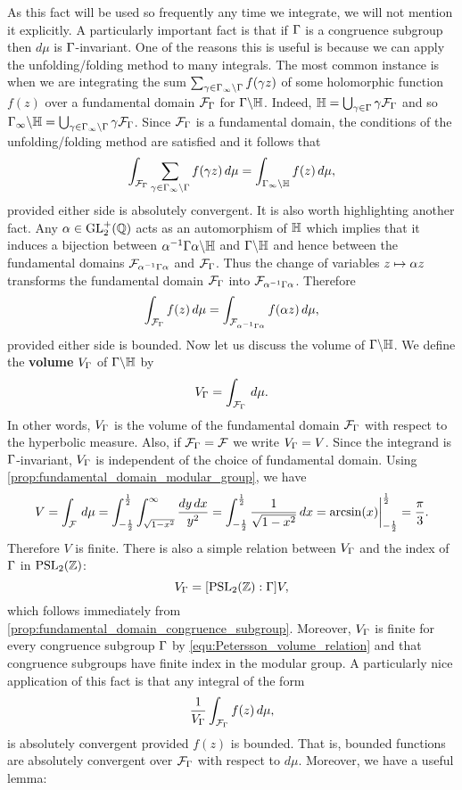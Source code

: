     As this fact will be used so frequently any time we integrate, we will not mention it explicitly. A particularly important fact is that if $\Gamma$ is a congruence subgroup then $d\mu$ is $\Gamma$-invariant. One of the reasons this is useful is because we can apply the unfolding/folding method to many integrals. The most common instance is when we are integrating the sum $\sum_{\gamma \in \Gamma_{\infty}\backslash\Gamma}f(\gamma z)$ of some holomorphic function $f(z)$ over a fundamental domain $\mathcal{F}_{\Gamma}$ for $\Gamma\backslash\mathbb{H}$. Indeed, $\mathbb{H} = \bigcup_{\gamma \in \Gamma}\gamma\mathcal{F}_{\Gamma}$ and so $\Gamma_{\infty}\backslash\mathbb{H} = \bigcup_{\gamma \in \Gamma_{\infty}\backslash\Gamma}\gamma\mathcal{F}_{\Gamma}$. Since $\mathcal{F}_{\Gamma}$ is a fundamental domain, the conditions of the unfolding/folding method are satisfied and it follows that
    \[
      \int_{\mathcal{F}_{\Gamma}}\sum_{\gamma \in \Gamma_{\infty}\backslash\Gamma}f(\gamma z)\,d\mu = \int_{\Gamma_{\infty}\backslash\mathbb{H}}f(z)\,d\mu,
    \]
    provided either side is absolutely convergent. It is also worth highlighting another fact. Any $\alpha \in \mathrm{GL}_{2}^{+}(\mathbb{Q})$ acts as an automorphism of $\mathbb{H}$ which implies that it induces a bijection between $\alpha^{-1}\Gamma\alpha\backslash\mathbb{H}$ and $\Gamma\backslash\mathbb{H}$ and hence between the fundamental domains $\mathcal{F}_{\alpha^{-1}\Gamma\alpha}$ and $\mathcal{F}_{\Gamma}$. Thus the change of variables $z \mapsto \alpha z$ transforms the fundamental domain $\mathcal{F}_{\Gamma}$ into $\mathcal{F}_{\alpha^{-1}\Gamma\alpha}$. Therefore
    \[
      \int_{\mathcal{F}_{\Gamma}}f(z)\,d\mu = \int_{\mathcal{F}_{\alpha^{-1}\Gamma\alpha}}f(\alpha z)\,d\mu,
    \]
    provided either side is bounded. Now let us discuss the volume of $\Gamma\backslash\mathbb{H}$. We define the \textbf{volume} $V_{\Gamma}$ of $\Gamma\backslash\mathbb{H}$ by
    \[
      V_{\Gamma} = \int_{\mathcal{F}_{\Gamma}}\,d\mu.
    \]
    In other words, $V_{\Gamma}$ is the volume of the fundamental domain $\mathcal{F}_{\Gamma}$ with respect to the hyperbolic measure. Also, if $\mathcal{F}_{\Gamma} = \mathcal{F}$ we write $V_{\Gamma} = V$. Since the integrand is $\Gamma$-invariant, $V_{\Gamma}$ is independent of the choice of fundamental domain. Using \cref{prop:fundamental_domain_modular_group}, we have
    \[
      V = \int_{\mathcal{F}}\,d\mu = \int_{-\frac{1}{2}}^{\frac{1}{2}}\int_{\sqrt{1-x^{2}}}^{\infty}\frac{dy\,dx}{y^{2}} = \int_{-\frac{1}{2}}^{\frac{1}{2}}\frac{1}{\sqrt{1-x^{2}}}\,dx = \arcsin(x)\bigg|_{-\frac{1}{2}}^{\frac{1}{2}} = \frac{\pi}{3}.
    \]
    Therefore $V$ is finite. There is also a simple relation between $V_{\Gamma}$ and the index of $\Gamma$ in $\mathrm{PSL}_{2}(\mathbb{Z})$:
    \begin{equation}\label{equ:Petersson_volume_relation}
      V_{\Gamma} = [\mathrm{PSL}_{2}(\mathbb{Z}):\Gamma]V,
    \end{equation}
    which follows immediately from \cref{prop:fundamental_domain_congruence_subgroup}. Moreover, $V_{\Gamma}$ is finite for every congruence subgroup $\Gamma$ by \cref{equ:Petersson_volume_relation} and that congruence subgroups have finite index in the modular group. A particularly nice application of this fact is that any integral of the form
    \[
      \frac{1}{V_{\Gamma}}\int_{\mathcal{F}_{\Gamma}}f(z)\,d\mu,
    \]
    is absolutely convergent provided $f(z)$ is bounded. That is, bounded functions are absolutely convergent over $\mathcal{F}_{\Gamma}$ with respect to $d\mu$. Moreover, we have a useful lemma:

